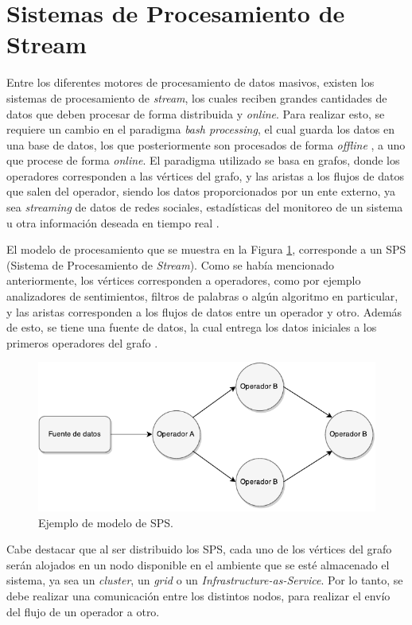 \section{Sistemas de Procesamiento de Stream}
\label{sec:SPS}

Entre los diferentes motores de procesamiento de datos masivos, existen los sistemas de procesamiento de \textsl{stream}, los cuales reciben grandes cantidades de datos que deben procesar de forma distribuida y \textsl{online}. Para realizar esto, se requiere un cambio en el paradigma \textsl{bash processing}, el cual guarda los datos en una base de datos, los que posteriormente son procesados de forma \textsl{offline} \citep{HawwashN14}, a uno que procese de forma \textsl{online}. El paradigma utilizado se basa en grafos, donde los operadores corresponden a las vértices del grafo, y las aristas a los flujos de datos que salen del operador, siendo los datos proporcionados por un ente externo, ya sea \textit{streaming} de datos de redes sociales, estadísticas del monitoreo de un sistema u otra información deseada en tiempo real \citep{Shahrivari14}.

El modelo de procesamiento que se muestra en la Figura \ref{fig:grafo}, corresponde a un SPS (Sistema de Procesamiento de \textit{Stream}). Como se había mencionado anteriormente, los vértices corresponden a operadores, como por ejemplo analizadores de sentimientos, filtros de palabras o algún algoritmo en particular, y las aristas corresponden a los flujos de datos entre un operador y otro. Además de esto, se tiene una fuente de datos, la cual entrega los datos iniciales a los primeros operadores del grafo \citep{AppelFFB12}.

\begin{figure}[ht!]
  \centering
    \includegraphics[scale=1]{images/SPS.pdf}
  \caption{Ejemplo de modelo de SPS.}
  \label{fig:grafo}
\end{figure}

Cabe destacar que al ser distribuido los SPS, cada uno de los vértices del grafo serán alojados en un nodo disponible en el ambiente que se esté almacenado el sistema, ya sea un \textit{cluster}, un \textit{grid} o un \textit{Infrastructure-as-Service}. Por lo tanto, se debe realizar una comunicación entre los distintos nodos, para realizar el envío del flujo de un operador a otro.

